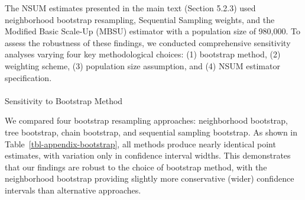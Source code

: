 \documentclass[
  12pt,
  letterpaper,
  DIV=11,
  numbers=noendperiod]{scrartcl}
\makeatletter
\let\oldparagraph\paragraph
\renewcommand{\paragraph}{
    \@ifstar
      \xxxParagraphStar
      \xxxParagraphNoStar
  }
\newcommand{\xxxParagraphStar}[1]{\oldparagraph*{#1}\mbox{}}
\newcommand{\xxxParagraphNoStar}[1]{\oldparagraph{#1}\mbox{}}
\theoremstyle{plain}
\theoremstyle{definition}
\makeatother
\begin{document}
The NSUM estimates presented in the main text (Section 5.2.3) used
neighborhood bootstrap resampling, Sequential Sampling weights, and the
Modified Basic Scale-Up (MBSU) estimator with a population size of
980,000. To assess the robustness of these findings, we conducted
comprehensive sensitivity analyses varying four key methodological
choices: (1) bootstrap method, (2) weighting scheme, (3) population size
assumption, and (4) NSUM estimator specification.

\paragraph{Sensitivity to Bootstrap
Method}\label{sensitivity-to-bootstrap-method}

We compared four bootstrap resampling approaches: neighborhood
bootstrap, tree bootstrap, chain bootstrap, and sequential sampling
bootstrap. As shown in Table~\ref{tbl-appendix-bootstrap}, all methods
produce nearly identical point estimates, with variation only in
confidence interval widths. This demonstrates that our findings are
robust to the choice of bootstrap method, with the neighborhood
bootstrap providing slightly more conservative (wider) confidence
intervals than alternative approaches.
\end{document}
